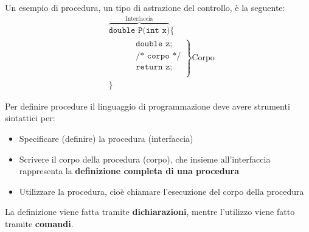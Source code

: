\documentclass[a4paper]{article}
\begin{document}
\begin{example}
  Un esempio di procedura, un tipo di astrazione del controllo, è la seguente:
  \[
    \begin{aligned}
      &\overbrace{\texttt{double P(int x)}}^{\text{Interfaccia}} \texttt{\{}\\
      &\quad\left.
      \begin{aligned}
        &\quad \texttt{double z;}\\
        &\quad \texttt{/* corpo */}\\
        &\quad \texttt{return z;}\\
      \end{aligned}
      \right\} \text{Corpo} \\
      &\texttt{\}}
    \end{aligned}
  \] 
\end{example}

\noindent
Per definire procedure il linguaggio di programmazione deve avere strumenti sintattici
per:
\begin{itemize}
  \item Specificare (definire) la procedura (interfaccia)

  \item Scrivere il corpo della procedura (corpo), che insieme all'interfaccia
    rappresenta la \textbf{definizione completa di una procedura}

  \item Utilizzare la procedura, cioè chiamare l'esecuzione del corpo della procedura
\end{itemize}
La definizione viene fatta tramite \textbf{dichiarazioni}, mentre l'utilizzo viene fatto
tramite \textbf{comandi}.
\end{document}
